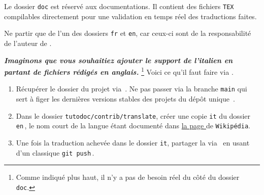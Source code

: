 \documentclass{../main/main}
\begin{document}
\begin{tdocnote}
    Le dossier \verb#doc# est réservé aux documentations. Il contient des fichiers \verb#TEX# compilables directement pour une validation en temps réel des traductions faites.
\end{tdocnote}


\begin{tdocwarn}
    Ne partir que de l'un des dossiers \verb#fr# et \verb#en#, car ceux-ci sont de la responsabilité de l'auteur de \thisproj.
\end{tdocwarn}


\medskip


\emph{\textbf{Imaginons que vous souhaitiez ajouter le support de l'italien en partant de fichiers rédigés en anglais.}}%
\footnote{
    Comme indiqué plus haut, il n'y a pas de besoin réel du côté du dossier \texttt{doc}.
}
Voici ce qu'il faut faire via \git.
%
\begin{enumerate}
    \item Récupérer le dossier du projet via \thisrepo\,.
    Ne pas passer via la branche \verb#main# qui sert à figer les dernières versions stables des projets du dépôt unique \thismonorepo\,.

    \item Dans le dossier \verb#tutodoc/contrib/translate#, créer une copie \verb#it# du dossier \verb#en#\,, le nom court de la langue étant documenté dans
    \href{https://en.wikipedia.org/wiki/IETF_language_tag#List_of_common_primary_language_subtags}%
         {la page }
    de \texttt{Wikipédia}.

    \item Une fois la traduction achevée dans le dossier \verb#it#, partager la via \thisrepo\ en usant d'un classique \verb#git push#\,.
\end{enumerate}
\end{document}
